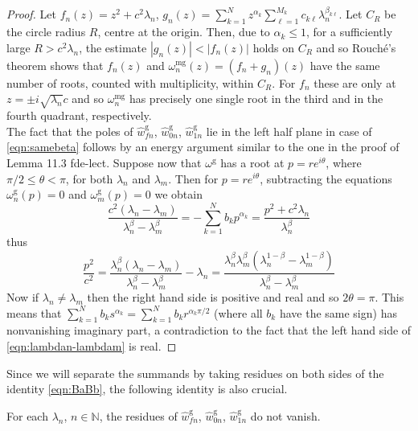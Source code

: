 \begin{proof}
Let $f_n(z) = z^2 + c^2\lambda_n$, $g_n(z) = \sum_{k=1}^N z^{\alpha_k}\sum_{\ell=1}^{M_k} c_{k\ell}\lambda_n^{\beta_{k\ell}}$.
Let $C_R$ be the circle radius $R$, centre at the origin.
Then, due to $\alpha_k\leq1$, for a sufficiently large $R>c^2\lambda_n$, the estimate $|g_n(z)| < |f_n(z)|$ holds on $C_R$ and so Rouch\'{e}'s theorem shows that
$f_n(z)$ and $\omega^{\text{mg}}_n(z)=(f_n+g_n)(z)$ have the same number of roots, counted with multiplicity, within $C_R$.
For $f_n$ these are only at $z=\pm i\sqrt{\lambda_n}c$
and so $\omega^{\text{mg}}_n$ has 
precisely one single root in the third and in the fourth quadrant, respectively.
\\
The fact that the poles of $\hat{w}^{\text{g}}_{fn}$, $\hat{w}^{\text{g}}_{0n}$, $\hat{w}^{\text{g}}_{1n}$ lie in the left half plane in case of \eqref{eqn:samebeta} follows by an energy argument similar to the one in the proof of Lemma 11.3 fde-lect.
Suppose now that $\omega^{\text{g}}$ has a root at $p=r e^{i\theta}$,
where $\pi/2\leq\theta<\pi$, for both $\lambda_n$ and $\lambda_m$. Then for $p=r e^{i\theta}$, subtracting the equations $\omega^{\text{g}}_n(p)=0$ and $\omega^{\text{g}}_m(p)=0$ we obtain
\begin{equation}\label{eqn:lambdan-lambdam}
\frac{c^2(\lambda_n - \lambda_m)}{\lambda_n^\beta-\lambda_m^\beta} = - \sum_{k=1}^N b_k p^{\alpha_k} = \frac{p^2+c^2\lambda_n}{\lambda_n^\beta}
\end{equation}
thus
$$
\frac{p^2}{c^2}
=\frac{\lambda_n^\beta(\lambda_n - \lambda_m)}{\lambda_n^\beta-\lambda_m^\beta}-\lambda_n
=\frac{\lambda_n^\beta\lambda_m^\beta(\lambda_n^{1-\beta}-\lambda_m^{1-\beta})}{\lambda_n^\beta-\lambda_m^\beta}
$$
Now if $\lambda_n \not=\lambda_m$ then the right hand side is positive and real
and so $2\theta =\pi$.
This means that $\sum_{k=1}^N b_k s^{\alpha_k}= \sum_{k=1}^N b_k r^{\alpha_k\pi/2}$ (where all $b_k$ have the same sign) has nonvanishing imaginary part, a contradiction to the fact that the left hand side of \eqref{eqn:lambdan-lambdam} is real.
\end{proof}
Since we will separate the summands by taking residues on both sides of the identity \eqref{eqn:BaBb}, the following identity is also crucial.
\begin{lemma}\label{lem:residues}
For each $\lambda_n$, $n\in\mathbb{N}$, the residues of $\hat{w}^{\text{g}}_{fn}$, $\hat{w}^{\text{g}}_{0n}$, $\hat{w}^{\text{g}}_{1n}$ do not vanish.
\end{lemma}
